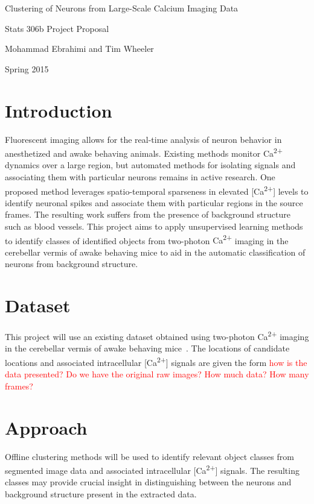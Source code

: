 \documentclass[11pt]{article}
\newcommand{\calcium}[0]{Ca\textsuperscript{2+}}
\newcommand{\todo}[1]{\textcolor{red}{#1}}
\begin{document}
\begin{center}
    {\LARGE Clustering of Neurons from Large-Scale Calcium Imaging Data}

    Stats 306b Project Proposal

    Mohammad Ebrahimi and Tim Wheeler

    Spring 2015
\end{center}

\section{Introduction}

Fluorescent imaging allows for the real-time analysis of neuron behavior in anesthetized and awake behaving animals. 
Existing methods monitor {\calcium} dynamics over a large region, but automated methods for isolating signals and associating them with particular neurons remains in active research.
One proposed method leverages spatio-temporal sparseness in elevated [\calcium] levels to identify neuronal spikes and associate them with particular regions in the source frames.
The resulting work suffers from the presence of background structure such as blood vessels.
This project aims to apply unsupervised learning methods to identify classes of identified objects from two-photon {\calcium} imaging in the cerebellar vermis of awake behaving mice to aid in the automatic classification of neurons from background structure.

\section{Dataset}

This project will use an existing dataset obtained using two-photon {\calcium} imaging in the cerebellar vermis of awake behaving mice~\cite{Mukamel2009}.
The locations of candidate locations and associated intracellular [\calcium] signals are given the form \todo{how is the data presented? Do we have the original raw images?}
\todo{How much data? How many frames?}

\section{Approach}

Offline clustering methods will be used to identify relevant object classes from segmented image data and associated intracellular [\calcium] signals.
The resulting classes may provide crucial insight in distinguishing between the neurons and background structure present in the extracted data.
\end{document}
